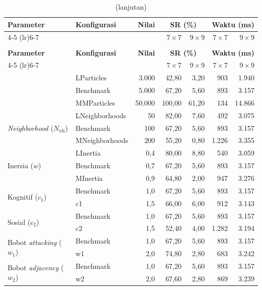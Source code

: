 \begin{longtable}{llrrrrr}
	\caption{Ringkasan pengaruh parameter terhadap tingkat keberhasilan (\%)}
	\label{tab:pso-ringkasan-param} \\
	\toprule
	\textbf{Parameter} & \textbf{Konfigurasi} & \textbf{Nilai} & \multicolumn{2}{c}{\textbf{SR (\%)}} & \multicolumn{2}{c}{\textbf{Waktu (ms)}} \\
	\cmidrule(lr){4-5} \cmidrule(lr){6-7}
	& & & $7 \times 7$ & $9 \times 9$ & $7 \times 7$ & $9 \times 9$ \\
	\midrule
	\endfirsthead
	\caption[]{(lanjutan)} \\
	\toprule
	\textbf{Parameter} & \textbf{Konfigurasi} & \textbf{Nilai} & \multicolumn{2}{c}{\textbf{SR (\%)}} & \multicolumn{2}{c}{\textbf{Waktu (ms)}} \\
	\cmidrule(lr){4-5} \cmidrule(lr){6-7}
	& & & $7 \times 7$ & $9 \times 9$ & $7 \times 7$ & $9 \times 9$ \\
	\midrule
	\endhead
	\bottomrule
	\endfoot
	\multirow{3}{*}{Jumlah partikel ($P$)}
	& LParticles  & 3.000  & 42,80 &  3,20 &   903 & 1.940 \\
	& Benchmark   & 5.000  & 67,20 &  5,60 &   893 & 3.157 \\
	& MMParticles & 50.000 & 100,00 & 61,20 &   134 & 14.866 \\
	\midrule
	\multirow{3}{*}{\textit{Neighborhood} ($N_{\textit{nh}}$)}
	& LNeighborhoods & 50  & 82,00 & 7,60 & 492 & 3.075 \\
	& Benchmark      & 100 & 67,20 & 5,60 & 893 & 3.157 \\
	& MNeighborhoods & 200 & 55,20 & 0,80 & 1.226 & 3.355 \\
	\midrule
	\multirow{3}{*}{Inersia ($w$)}
	& LInertia  & 0,4 & 80,00 & 8,80 & 540 & 3.059 \\
	& Benchmark & 0,7 & 67,20 & 5,60 & 893 & 3.157 \\
	& MInertia  & 0,9 & 64,80 & 2,00 & 947 & 3.276 \\
	\midrule
	\multirow{2}{*}{Kognitif ($c_1$)}
	& Benchmark & 1,0 & 67,20 & 5,60 & 893 & 3.157 \\
	& c1        & 1,5 & 66,00 & 6,00 & 912 & 3.143 \\
	\midrule
	\multirow{2}{*}{Sosial ($c_2$)}
	& Benchmark & 1,0 & 67,20 & 5,60 & 893 & 3.157 \\
	& c2        & 1,5 & 52,40 & 4,00 & 1.282 & 3.194 \\
	\midrule
	\multirow{2}{*}{Bobot \textit{attacking} ($w_1$)}
	& Benchmark & 1,0 & 67,20 & 5,60 & 893 & 3.157 \\
	& w1        & 2,0 & 74,80 & 2,80 & 683 & 3.242 \\
	\midrule
	\multirow{2}{*}{Bobot \textit{adjacency} ($w_2$)}
	& Benchmark & 1,0 & 67,20 & 5,60 & 893 & 3.157 \\
	& w2        & 2,0 & 67,60 & 2,80 & 869 & 3.239 \\
\end{longtable}

